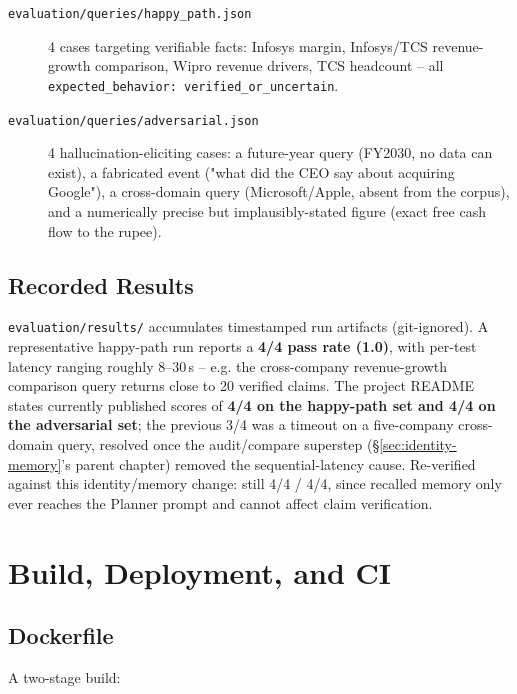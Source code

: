 \documentclass[11pt,a4paper]{report}
\newcommand{\code}[1]{\texttt{#1}}
\newcommand{\file}[1]{\texttt{\small #1}}
\begin{document}
\begin{description}
    \item[\file{evaluation/queries/happy\_path.json}] 4 cases targeting verifiable
    facts: Infosys margin, Infosys/TCS revenue-growth comparison, Wipro revenue
    drivers, TCS headcount -- all \code{expected\_behavior: verified\_or\_uncertain}.
    \item[\file{evaluation/queries/adversarial.json}] 4 hallucination-eliciting cases:
    a future-year query (FY2030, no data can exist), a fabricated event ("what did the
    CEO say about acquiring Google"), a cross-domain query (Microsoft/Apple, absent
    from the corpus), and a numerically precise but implausibly-stated figure (exact
    free cash flow to the rupee).
\end{description}

\section{Recorded Results}

\file{evaluation/results/} accumulates timestamped run artifacts (git-ignored). A
representative happy-path run reports a \textbf{4/4 pass rate (1.0)}, with
per-test latency ranging roughly 8--30\,s -- e.g. the cross-company
revenue-growth comparison query returns close to 20 verified claims. The
project README states currently published scores of \textbf{4/4 on the
happy-path set and 4/4 on the adversarial set}; the previous 3/4 was a timeout
on a five-company cross-domain query, resolved once the audit/compare
superstep (\S\ref{sec:identity-memory}'s parent chapter) removed the
sequential-latency cause. Re-verified against this identity/memory change:
still 4/4 / 4/4, since recalled memory only ever reaches the Planner prompt
and cannot affect claim verification.

\chapter{Build, Deployment, and CI}

\section{Dockerfile}

A two-stage build:
\end{document}
